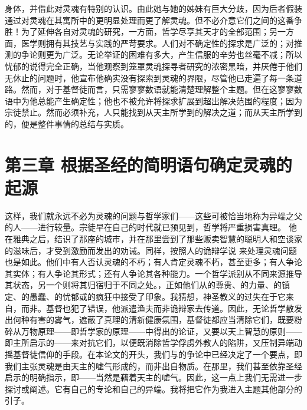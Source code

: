 身体，并借此对灵魂有特别的认识。由此她与她的姊妹有巨大分歧，因为后者假装通过对灵魂在其寓所中的更明显处理而更了解灵魂。但不必介意它们之间的这番争胜！为了延伸各自对灵魂的研究，一方面，哲学尽享其天才的全部范围；另一方面，医学则拥有其技艺与实践的严苛要求。人们对不确定性的探求是广泛的；对推测的争论则更为广泛。无论举证的困难有多大，产生信服的辛劳也丝毫不减；所以忧郁的说得完全正确，当他观察到笼罩灵魂探寻者研究的浓密黑暗，并厌倦于他们无休止的问题时，他宣布他确实没有探索到灵魂的界限，尽管他已走遍了每一条道路。然而，对于基督徒而言，只需寥寥数语就能清楚理解整个主题。但在这寥寥数语中为他总能产生确定性；他也不被允许将探求扩展到超出解决范围的程度；因为宗徒禁止。然而必须补充，人只能找到从天主所学到的解决之道；而从天主所学到的，便是整件事情的总结与实质。\par


\section{第三章 根据圣经的简明语句确定灵魂的起源}

 这样，我们就永远不必为灵魂的问题与哲学家们——这些可被恰当地称为异端之父的人——进行较量。宗徒早在自己的时代就已预见到，哲学将严重损害真理。 他在雅典之后，结识了那座的城市，并在那里尝到了那些贩卖智慧的聪明人和空谈家的滋味后，才受到激励而发出的劝诫。同样，按照人的诡辩学说 来处理灵魂问题也是如此。他们中有人否认灵魂的不朽；有人肯定灵魂不朽，甚至更多；有人争论其实体；有人争论其形式；还有人争论其各种能力。一个哲学派别从不同来源推导其状态，另一个则将其归宿归于不同之处。，正如他们从的尊贵、的力量、的镇定、的愚蠢、的忧郁或的疯狂中接受了印象。我猜想，神圣教义的过失在于它来自，而非。基督也犯了错误，他派遣渔夫而非诡辩家去传道。因此，无论哲学散发出何种有害的雾气，遮蔽了真理的清新健康氛围，基督徒都应当清除它们，既要粉碎从万物原理——即哲学家的原理——中得出的论证，又要以天上智慧的原则——即主所启示的——来对抗它们，以便既消除哲学俘虏外教人的陷阱，又压制异端动摇基督徒信仰的手段。在本论文的开头，我们与的争论中已经决定了一个要点，即我们主张灵魂是由天主的嘘气形成的，而非出自物质。在那里，我们甚至依靠圣经启示的明确指示，即——当然是藉着天主的嘘气。因此，这一点上我们无需进一步探讨或阐述。它有自己的专论和自己的异端。我将把它作为我进入主题其他部分的引子。\par

